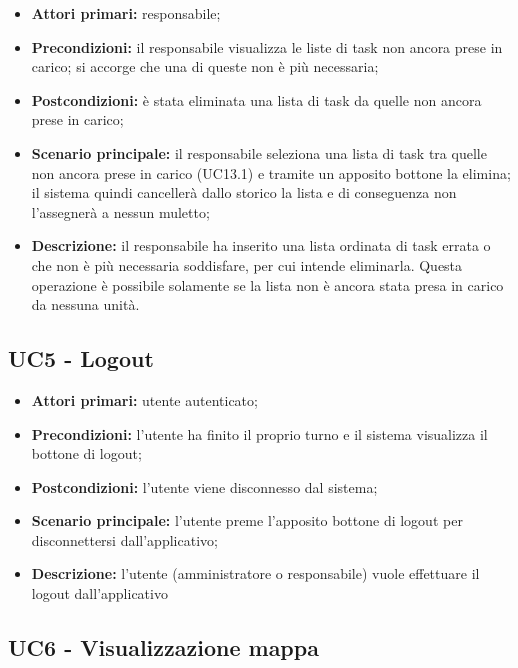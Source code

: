 \begin{itemize}
	\item 	\textbf{Attori primari:} responsabile;
	\item 	\textbf{Precondizioni:} il responsabile visualizza le liste di task non ancora prese in carico; si accorge che una di queste non è più necessaria;
	\item 	\textbf{Postcondizioni:} è stata eliminata una lista di task da quelle non ancora prese in carico;
	\item 	\textbf{Scenario principale:} il responsabile seleziona una lista di task tra quelle non ancora prese in carico (UC13.1) e tramite un apposito bottone la elimina; il sistema quindi cancellerà dallo storico la lista e di conseguenza non l'assegnerà a nessun muletto;
	\item 	\textbf{Descrizione:} il responsabile ha inserito una lista ordinata di task errata o che non è più necessaria soddisfare, per cui intende eliminarla. Questa operazione è possibile solamente se la lista non è ancora stata presa in carico da nessuna unità.
\end{itemize}


\subsection{UC5 - Logout}

\begin{itemize}
	\item 	\textbf{Attori primari:} utente autenticato;
	\item 	\textbf{Precondizioni:} l'utente ha finito il proprio turno e il sistema visualizza il bottone di logout;
	\item 	\textbf{Postcondizioni:} l'utente viene disconnesso dal sistema;
	\item 	\textbf{Scenario principale:} l'utente preme l'apposito bottone di logout per disconnettersi dall'applicativo;
	\item 	\textbf{Descrizione:} l'utente (amministratore o responsabile) vuole effettuare il logout dall'applicativo
\end{itemize}


\subsection{UC6 - Visualizzazione mappa}

